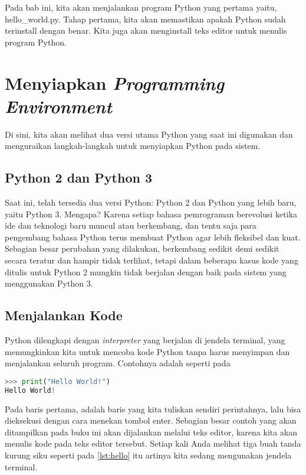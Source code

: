 Pada bab ini, kita akan menjalankan program Python yang pertama yaitu, hello\_world.py. Tahap pertama, kita akan memastikan apakah Python sudah terinstall dengan benar. Kita juga akan menginstall teks editor untuk menulis program Python.
\section{Menyiapkan \textit{Programming Environment}}
Di sini, kita akan melihat dua versi utama Python yang saat ini digunakan dan menguraikan langkah-langkah untuk menyiapkan Python pada sistem.
\subsection{Python 2 dan Python 3}
Saat ini, telah tersedia dua versi Python: Python 2 dan Python yang lebih baru, yaitu Python 3. Mengapa? Karena setiap bahasa pemrograman berevolusi ketika ide dan teknologi baru muncul atau berkembang, dan tentu saja para pengembang bahasa Python terus membuat Python agar lebih fleksibel dan kuat. Sebagian besar perubahan yang dilakukan, berkembang sedikit demi sedikit secara teratur dan hampir tidak terlihat, tetapi dalam beberapa kasus kode yang ditulis untuk Python 2 mungkin tidak berjalan dengan baik pada sistem yang menggunakan Python 3.
\subsection{Menjalankan Kode}
Python dilengkapi dengan \textit{interpreter} yang berjalan di jendela terminal, yang memungkinkan kita untuk mencoba kode Python tanpa harus menyimpan dan menjalankan seluruh program. Contohnya adalah seperti pada
\begin{lstlisting}[linewidth=5.4cm, language=Python, label={lst:hello}]
>>> print("Hello World!")
Hello World!
\end{lstlisting}
Pada baris pertama, adalah baris yang kita tuliskan sendiri perintahnya, lalu bisa dieksekusi dengan cara menekan tombol enter. Sebagian besar contoh yang akan ditampilkan pada buku ini akan dijalankan melalui teks editor, karena kita akan menulis kode pada teks editor tersebut. Setiap kali Anda melihat tiga buah tanda kurung siku seperti pada \ref{lst:hello} itu artinya kita sedang mengunakan jendela terminal.